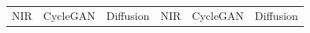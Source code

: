 \begin{figure}[htp!]
    \centering
    \begin{tabularx}{\textwidth}{>{\centering\arraybackslash}X >{\centering\arraybackslash}X >{\centering\arraybackslash}X >{\centering\arraybackslash}X >{\centering\arraybackslash}X >{\centering\arraybackslash}X}
        NIR                                                                                  & CycleGAN                                                                                       & Diffusion                                                                                  & NIR                                                                                  & CycleGAN                                                                                       & Diffusion                                                                                  \\

\end{tabularx}
\end{figure}
